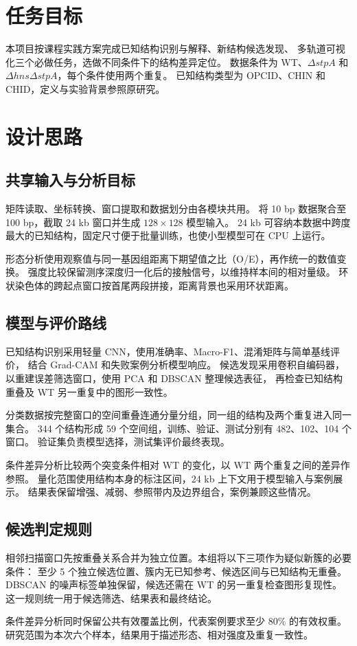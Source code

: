 \section{任务目标}
本项目按课程实践方案完成已知结构识别与解释、新结构候选发现、
多轨道可视化三个必做任务，选做不同条件下的结构差异定位。
数据条件为 WT、$\Delta stpA$ 和 $\Delta hns\Delta stpA$，每个条件使用两个重复。
已知结构类型为 OPCID、CHIN 和 CHID，定义与实验背景参照原研究。

\section{设计思路}
\subsection{共享输入与分析目标}
矩阵读取、坐标转换、窗口提取和数据划分由各模块共用。
将 10 bp 数据聚合至 100 bp，截取 24 kb 窗口并生成 $128\times128$ 模型输入。
24 kb 可容纳本数据中跨度最大的已知结构，固定尺寸便于批量训练，也使小型模型可在 CPU 上运行。

形态分析使用观察值与同一基因组距离下期望值之比（O/E），再作统一的数值变换。
强度比较保留测序深度归一化后的接触信号，以维持样本间的相对量级。
环状染色体的跨起点窗口按首尾两段拼接，距离背景也采用环状距离。

\subsection{模型与评价路线}
已知结构识别采用轻量 CNN，使用准确率、Macro-F1、混淆矩阵与简单基线评价，
结合 Grad-CAM 和失败案例分析模型响应。
候选发现采用卷积自编码器，以重建误差筛选窗口，使用 PCA 和 DBSCAN 整理候选表征，
再检查已知结构重叠及 WT 另一重复中的图形一致性。

分类数据按完整窗口的空间重叠连通分量分组，同一组的结构及两个重复进入同一集合。
344 个结构形成 59 个空间组，训练、验证、测试分别有 482、102、104 个窗口。
验证集负责模型选择，测试集评价最终表现。

条件差异分析比较两个突变条件相对 WT 的变化，以 WT 两个重复之间的差异作参照。
量化范围使用结构本身的标注区间，24 kb 上下文用于模型输入与案例展示。
结果表保留增强、减弱、参照带内及边界组合，案例兼顾这些情况。

\subsection{候选判定规则}
相邻扫描窗口先按重叠关系合并为独立位置。本组将以下三项作为疑似新簇的必要条件：
至少 5 个独立候选位置、簇内无已知参考、候选区间与已知结构无重叠。
DBSCAN 的噪声标签单独保留，候选还需在 WT 的另一重复检查图形复现性。
这一规则统一用于候选筛选、结果表和最终结论。

条件差异分析同时保留公共有效覆盖比例，代表案例要求至少 80\% 的有效权重。
研究范围为本次六个样本，结果用于描述形态、相对强度及重复一致性。

